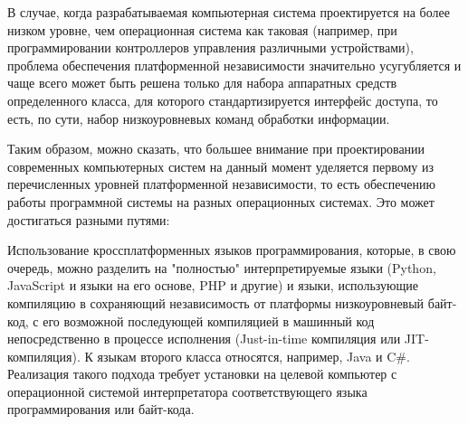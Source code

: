 В случае, когда разрабатываемая компьютерная система проектируется на более низком уровне, чем операционная система как таковая (например, при программировании контроллеров управления различными устройствами), проблема обеспечения платформенной независимости значительно усугубляется и чаще всего может быть решена только для набора аппаратных средств определенного класса, для которого стандартизируется интерфейс доступа, то есть, по сути, набор низкоуровневых команд обработки информации.

Таким образом, можно сказать, что большее внимание при проектировании современных компьютерных систем на данный момент уделяется первому из перечисленных уровней платформенной независимости, то есть обеспечению работы программной системы на разных операционных системах. Это может достигаться разными путями:
\begin{textitemize}
	\item Использование кроссплатформенных языков программирования, которые, в свою очередь, можно разделить на "полностью"{} интерпретируемые языки (Python, JavaScript и языки на его основе, PHP и другие) и языки, использующие компиляцию в сохраняющий независимость от платформы низкоуровневый байт-код, с его возможной последующей компиляцией в машинный код непосредственно в процессе исполнения (Just-in-time компиляция или JIT-компиляция). К языкам второго класса относятся, например, Java и C\#. Реализация такого подхода требует установки на целевой компьютер с операционной системой интерпретатора соответствующего языка программирования или байт-кода.
	

\end{textitemize}
